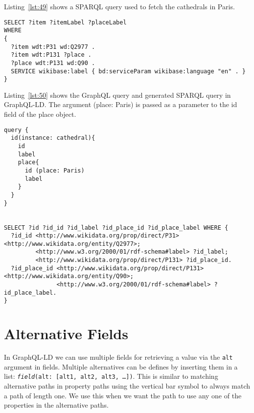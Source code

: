 Listing~\ref{lst:49} shows a SPARQL query used to fetch the cathedrals in Paris. 


\begin{minipage}{\linewidth}
\begin{lstlisting}[label=lst:49, caption={SPARQL query to fetch cathedrals in Paris}, language=SPARQL]
SELECT ?item ?itemLabel ?placeLabel
WHERE
{
  ?item wdt:P31 wd:Q2977 .
  ?item wdt:P131 ?place .
  ?place wdt:P131 wd:Q90 .
  SERVICE wikibase:label { bd:serviceParam wikibase:language "en" . }
}
\end{lstlisting}
\end{minipage}

Listing~\ref{lst:50} shows the GraphQL query and generated SPARQL query in GraphQL-LD. The argument (place: Paris) is passed as a parameter to the id field of the place object.

\begin{minipage}{\linewidth}
\begin{lstlisting}[columns=fullflexible, label=lst:50, caption={GraphQL query and generated SPARQL query in GraphQL-LD}, language=SPARQL]
query {
  id(instance: cathedral){
    id
    label
    place{
      id (place: Paris)
      label
    }
  }
}


SELECT ?id ?id_id ?id_label ?id_place_id ?id_place_label WHERE {
  ?id_id <http://www.wikidata.org/prop/direct/P31> <http://www.wikidata.org/entity/Q2977>;
         <http://www.w3.org/2000/01/rdf-schema#label> ?id_label;
         <http://www.wikidata.org/prop/direct/P131> ?id_place_id.
  ?id_place_id <http://www.wikidata.org/prop/direct/P131> <http://www.wikidata.org/entity/Q90>;
               <http://www.w3.org/2000/01/rdf-schema#label> ?id_place_label.
}
\end{lstlisting}
\end{minipage}


\section{Alternative Fields}

In GraphQL-LD we can use multiple fields for retrieving a value via the \texttt{alt} argument in fields. Multiple alternatives can be defines by inserting them in a list: \texttt{\textit{field}(alt: [alt1, alt2, alt3, …])}. This is similar to matching alternative paths in property paths using the vertical bar symbol to always match a path of length one. We use this when we want the path to use any one of the properties in the alternative paths. 

